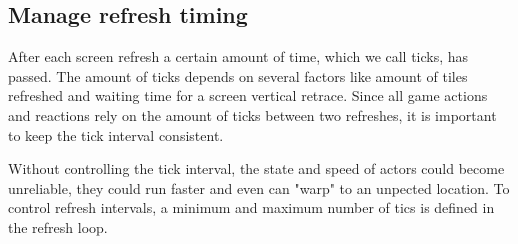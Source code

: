 \documentclass[book.tex]{subfiles}
\begin{document}
\subsection{Manage refresh timing}
After each screen refresh a certain amount of time, which we call ticks, has passed. The amount of ticks depends on several factors like amount of tiles refreshed and waiting time for a screen vertical retrace. Since all game actions and reactions rely on the amount of ticks between two refreshes, it is important to keep the tick interval consistent.\\

\par
Without controlling the tick interval, the state and speed of actors could become unreliable, they could run faster and even can "warp" to an unpected location. To control refresh intervals, a minimum and maximum number of tics is defined in the refresh loop.\\

\par
\begin{minipage}{\textwidth}
  
\end{minipage}
\label{time_ticks}
\par
\end{document}
